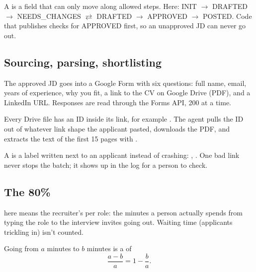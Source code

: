 \begin{definition}
A  is a field that can only move along allowed steps. Here: INIT $\to$ DRAFTED $\to$ NEEDS\_CHANGES $\rightleftarrows$ DRAFTED $\to$ APPROVED $\to$ POSTED. Code that publishes checks for APPROVED first, so an unapproved JD can never go out.
\end{definition}

\subsection*{Sourcing, parsing, shortlisting}

\begin{definition}
The approved JD goes into a Google Form with six questions: full name, email, years of experience, why you fit, a link to the CV on Google Drive (PDF), and a LinkedIn URL. Responses are read through the Forms API, 200 at a time.
\end{definition}

\begin{definition}
Every Drive file has an ID inside its link, for example . The agent pulls the ID out of whatever link shape the applicant pasted, downloads the PDF, and extracts the text of the first 15 pages with .
\end{definition}

\begin{definition}
A  is a label written next to an applicant instead of crashing: , . One bad link never stops the batch; it shows up in the log for a person to check.
\end{definition}

\subsection*{The 80\%}

\begin{definition}
 here means the recruiter's  per role: the minutes a person actually spends from typing the role to the interview invites going out. Waiting time (applicants trickling in) isn't counted.
\end{definition}

\begin{definition}
Going from $a$ minutes to $b$ minutes is a  of
\[
\frac{a - b}{a} = 1 - \frac{b}{a}.
\]
\end{definition}

